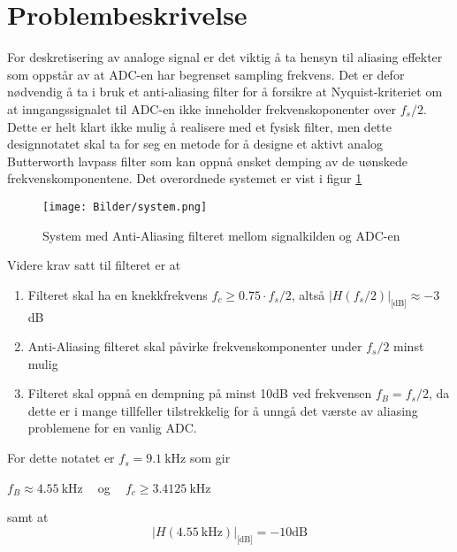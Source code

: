 \section{Problembeskrivelse}
\label{problemBeskrivelse}

For deskretisering av analoge signal er det viktig å ta hensyn til aliasing effekter som oppstår av at ADC-en har begrenset
sampling frekvens. Det er defor nødvendig å ta i bruk et anti-aliasing filter for å forsikre at Nyquist-kriteriet om at 
inngangssignalet til ADC-en ikke inneholder frekvenskoponenter over $f_s / 2$. Dette er helt klart ikke mulig å realisere 
med et fysisk filter, men dette designnotatet skal ta for seg en metode for å designe et aktivt analog Butterworth lavpass filter
som kan oppnå ønsket demping av de uønskede frekvenskomponentene. Det overordnede systemet er vist i figur \ref{system-figure}
\begin{figure}[H]
    \centering
    \texttt{[image: Bilder/system.png]}
    \caption{System med Anti-Aliasing filteret mellom signalkilden og ADC-en \cite{problembeskrivelse}}
    \label{system-figure}
\end{figure}

Videre krav satt til filteret er at 
\begin{enumerate}
    \item Filteret skal ha en knekkfrekvens $f_c \geq 0.75 \cdot f_s / 2$, altså $|H(f_s/2)|_{\text{[dB]}} \approx -3$dB
    \item Anti-Aliasing filteret skal påvirke frekvenskomponenter under $f_s/2$ minst mulig
    \item Filteret skal oppnå en dempning på minst 10dB ved frekvensen $f_B = f_s / 2$, da dette er i mange tillfeller 
        tilstrekkelig for å unngå det værste av aliasing problemene for en vanlig ADC.
\end{enumerate}

For dette notatet er $f_s = \SI{9.1}{\kilo\hertz}$ som gir 
\begin{center}
    $f_B \approx \SI{4.55}{\kilo\hertz}\:\:\:\:$ og $\:\:\:\:f_c \geq \SI{3.4125}{\kilo\hertz}$
\end{center}
samt at 
\[
    |H(\SI{4.55}{\kilo\hertz})|_{\text{[dB]}} = -10\text{dB}
\]
